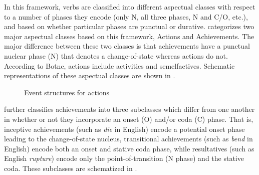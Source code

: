 \documentclass[output=paper,newtxmath,modfonts,nonflat,draftmode]{langsci/langscibook}
\begin{document}
In this framework, verbs are classified into different aspectual classes with respect to a number of phases they encode (only N, all three phases, N and C/O, etc.), and based on whether particular phases are punctual or durative. \citet[32--33]{Botne2010} categorizes two major aspectual classes based on this framework, Actions and Achievements. The major difference between these two classes is that achievements have a punctual nuclear phase (N) that denotes a change-of-state whereas actions do not. According to Botne, actions include  activities and semelfactives. Schematic representations of these aspectual classes are shown in .

\begin{figure}
\caption{Event structures for actions \citep[33]{Botne2010}}
\label{fig:kanijo:2}
\end{figure}

\citet{Botne2010} further classifies achievements into three subclasses which differ from one another in whether or not they incorporate an onset (O) and/or coda (C) phase. That is, inceptive achievements (such as \textit{die} in English) encode a potential onset phase leading to the change-of-state nucleus, transitional achievements (such as \textit{bend} in English) encode both an onset and stative coda phase, while resultatives (such as English \textit{rupture}) encode only the point-of-transition (N phase) and the stative coda. These subclasses are schematized in .
\end{document}
